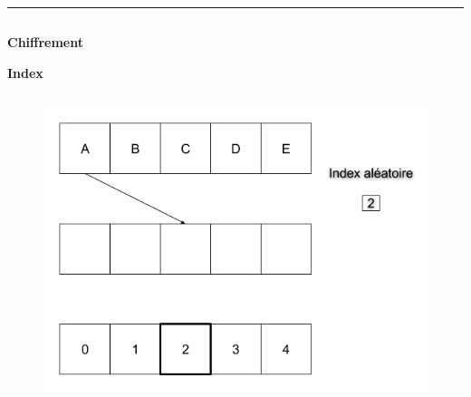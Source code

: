 \documentclass{beamer}
\begin{document}
\begin{frame}[t]
        \vspace{2em}
        \rule{\linewidth}{2mm}


        \begin{columns}[t]

            \begin{column}{.5\linewidth}
                \begin{center}
                    {\textbf{Chiffrement}}
                \end{center}


                \begin{block}{\centering \textbf{Index}}
                    \vspace{.5em}

                    \begin{columns}[t]
                        \begin{column}{.3\linewidth}
                            \begin{figure}[t]
                                \includegraphics[width=\linewidth]{rsc/index1_1.png}
                            \end{figure}
                        \end{column}


\end{columns}
\end{block}
\end{column}
\end{columns}
\end{frame}
\end{document}
